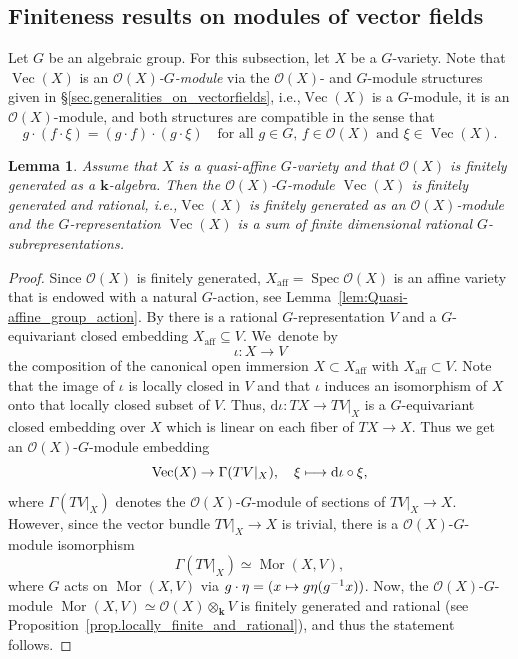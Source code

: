\documentclass[11pt]{article}
\newcommand{\ie}{i.e.,\xspace}
\numberwithin{equation}{section}
\let\mathcal\mathscr
\def\mto{\mathchoice{\longmapsto}{\mapsto}{\mapsto}{\mapsto}}
\theoremstyle{plain}
\newtheorem{lemma}[theorem]{Lemma}
\theoremstyle{definition}
\DeclareMathOperator{\Spec}{Spec}
\DeclareMathOperator{\aff}{aff}
\DeclareMathOperator{\Ve}{Vec}
\DeclareMathOperator{\Mor}{Mor}
\newcommand{\OO}{\mathcal{O}}
\newcommand{\kk}{{\boldsymbol{k}}}
\begin{document}
\subsection{Finiteness results on modules of vector fields}

Let $G$ be an algebraic group. For this subsection, let $X$ be a $G$-variety.
Note that $\Ve(X)$ is an
\emph{$\OO(X)$-$G$-module} via the $\OO(X)$- and $G$-module structures given in \S\ref{sec.generalities_on_vectorfields},
\ie $\Ve(X)$ is a $G$-module, it is an $\OO(X)$-module,
and both structures are compatible in the sense that
\[
g \cdot (f \cdot \xi) = (g \cdot f) \cdot (g \cdot \xi) \quad
\textrm{for all $g \in G$, $f \in \OO(X)$ and $\xi \in \Ve(X)$.}
\]

\begin{lemma}
\label{lem.finiteness_and_rationality_of_VecX}
Assume that $X$ is a quasi-affine $G$-variety and that $\OO(X)$ is finitely generated as a $\kk$-algebra.
Then the $\OO(X)$-$G$-module $\Ve(X)$ is finitely generated and rational,
\ie $\Ve(X)$ is finitely generated as an $\OO(X)$-module
and the $G$\nobreakdash-repre\-sentation $\Ve(X)$ is a sum of finite dimensional
rational $G$-subrepresentations.
\end{lemma}

\begin{proof}
Since $\OO(X)$ is finitely generated, $X_{\aff} = \Spec \OO(X)$ is an affine variety
that is endowed with a natural $G$-action, see Lemma~\ref{lem:Quasi-affine_group_action}. By
\cite[Satz\,2, II.2.S]{Kr1984Geometrische-Metho} there is a rational $G$-representation $V$ and a $G$-equivariant
closed embedding $X_{\aff} \subseteq V$. We~denote by
\[
\iota \colon X \to V
\]
the composition of the canonical open immersion $X \subset X_{\aff}$ with $X_{\aff} \subset V$.
Note that the image of $\iota$ is locally closed in $V$ and that $\iota$ induces
an isomorphism of $X$ onto that locally closed subset of $V$.
Thus, $\mathrm{d} \iota \colon T X \to T V |_X$ is a $G$-equivariant closed
embedding over $X$ which is linear on each fiber of $T X \to X$.
Thus we get an $\OO(X)$-$G$-module embedding
\[
\Ve(X) \to \Gamma(TV |_X), \quad
\xi \mto \mathrm{d} \iota \circ \xi,
\]
where $\Gamma(TV |_X)$ denotes the $\OO(X)$-$G$-module
of sections of $TV |_X \to X$. However, since the vector bundle
$TV |_X \to X$ is trivial, there is a
$\OO(X)$-$G$-module isomorphism
\[
\Gamma(TV |_X) \simeq \Mor(X, V),
\]
where $G$ acts on $\Mor(X, V)$ via $g \cdot \eta = (x \mto g\eta(g^{-1}x))$.
Now, the $\OO(X)$-$G$-module
$\Mor(X, V) \simeq \OO(X) \otimes_{\kk} V$ is finitely generated and
rational (see Proposition~\ref{prop.locally_finite_and_rational}),
and thus the statement follows.
\end{proof}
\end{document}
